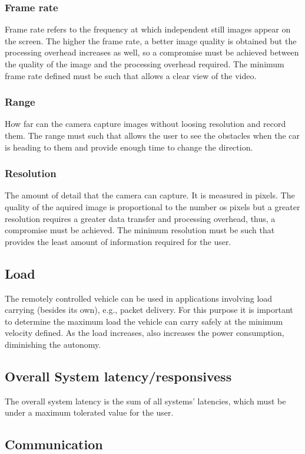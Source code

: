 \subsubsection{Frame rate}
\label{sec:org5adf4ee}
Frame rate refers to the frequency at which independent still images appear on the screen. The higher the frame rate, a better image quality is obtained but the processing overhead increases as well, so a compromise must be achieved between the quality of the image and the processing overhead required. The minimum frame rate defined must be such that allows a clear view of the video.
\subsubsection{Range}
\label{sec:orgecb044c}
How far can the camera capture images without loosing resolution and record them. The range must such that allows the user to see the obstacles when the car is heading to them and provide enough time to change the direction.
\subsubsection{Resolution}
\label{sec:orgba87554}
The amount of detail that the camera can capture. It is measured in pixels. The quality of the aquired image is proportional to the number os pixels but a greater resolution requires a greater data transfer and processing overhead, thus, a compromise must be achieved. The minimum resolution must be such that provides the least amount of information required for the user. 
\subsection{Load}
\label{sec:orgca6a690}
The remotely controlled vehicle can be used in applications involving load carrying (besides its own), e.g., packet delivery. For this purpose it is important to determine the maximum load the vehicle can carry safely at the minimum velocity deﬁned. As the load increases, also increases the power consumption, diminishing the autonomy.
\subsection{Overall System latency/responsivess}
\label{sec:org7fd1829}
The overall system latency is the sum of all systems' latencies, which must be under a maximum tolerated value for the user.
\subsection{Communication}
\label{sec:org4241610}

